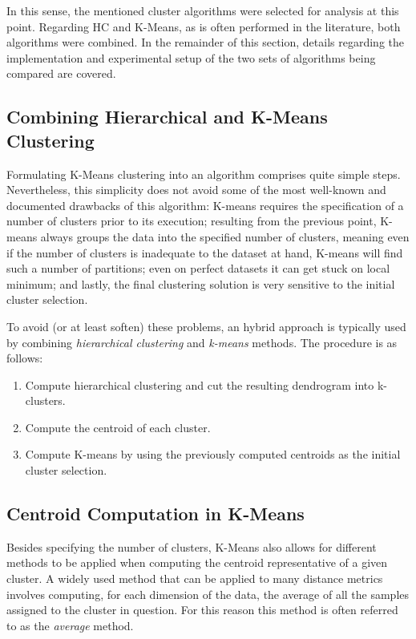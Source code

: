 \documentclass[9pt,journal,compsoc]{IEEEtran}
\begin{document}
In this sense, the mentioned cluster algorithms were selected for analysis at this point. Regarding HC and K-Means, as is often performed in the literature, both algorithms were combined\cite{jain2010data}. In the remainder of this section, details regarding the implementation and experimental setup of the two sets of algorithms being compared are covered.

\subsection{Combining Hierarchical and K-Means Clustering}

Formulating K-Means clustering into an algorithm comprises quite simple steps. Nevertheless, this simplicity does not avoid some of the most well-known and documented drawbacks of this algorithm: K-means requires the specification of a number of clusters prior to its execution; resulting from the previous point, K-means always groups the data into the specified number of clusters, meaning even if the number of clusters is inadequate to the dataset at hand, K-means will find such a number of partitions; even on perfect datasets it can get stuck on local minimum; and lastly, the final clustering solution is very sensitive to the initial cluster selection.

To avoid (or at least soften) these problems, an hybrid approach is typically used by combining \emph{hierarchical clustering} and \emph{k-means} methods. The procedure is as follows:

\begin{enumerate}
	\item Compute hierarchical clustering and cut the resulting dendrogram into k-clusters.
	
	\item Compute the centroid of each cluster.
	
	\item Compute K-means by using the previously computed centroids as the initial cluster selection.
\end{enumerate}

\subsection{Centroid Computation in K-Means}

Besides specifying the number of clusters, K-Means also allows for different methods to be applied when computing the centroid representative of a given cluster. A widely used method that can be applied to many distance metrics involves computing, for each dimension of the data, the average of all the samples assigned to the cluster in question. For this reason this method is often referred to as the \emph{average} method.
\end{document}

